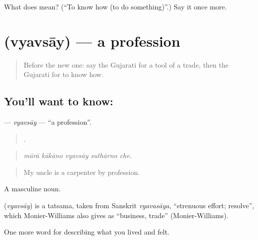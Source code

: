 \begin{tcolorbox}[breakable,colback=teal!4,colframe=teal!35!black,title={Before you move on}]
What does  mean? (\textquotedblleft{}To know how (to do something)\textquotedblright{}.) Say it once more.
\end{tcolorbox}
\section[\texorpdfstring{\gu{વ્યવસાય} (vyavsāy)}{વ્યવસાય (vyavsāy)}]{ (vyavsāy) — a profession}

\label{lesson:GU-C501-vyavsay}



\begin{quote}
Before the new one: say the Gujarati for a tool of a trade, then the Gujarati for to know how.
\end{quote}

\subsection*{You'll want to know: }
\textbf{} — \emph{vyavsāy} — \textquotedblleft{}a profession\textquotedblright{}.

\begin{quote}
    .
\end{quote}

\begin{quote}
\emph{mārā kākāno vyavsāy suthārno che.}
\end{quote}

\begin{quote}
My uncle is a carpenter by profession.
\end{quote}

A masculine noun.

\begin{cousinweb}
\textbf{} (\emph{vyavsāy}) is a tatsama, taken from Sanskrit \emph{vyavasāya}, \textquotedblleft{}strenuous effort; resolve\textquotedblright{}, which Monier-Williams also gives as \textquotedblleft{}business, trade\textquotedblright{} (Monier-Williams).
\end{cousinweb}

\begin{grammarlens}[title={What you've built}]
One more word for describing what you lived and felt.
\end{grammarlens}

